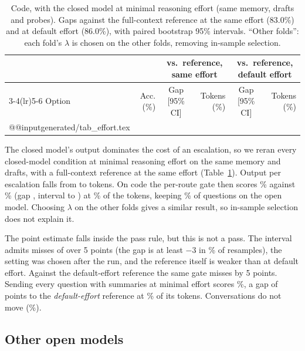 \documentclass[10pt,twocolumn]{article}
\makeatletter
\newcommand{\rows}[1]{\csname @@input\endcsname generated/#1 }
\makeatother
\begin{document}
\begin{table}[t]
\centering
\small
\caption{Code, with the closed model at minimal reasoning effort (same memory, drafts and probes). Gaps against the full-context reference at the same effort (83.0\%) and at default effort (86.0\%), with paired bootstrap 95\% intervals. ``Other folds'': each fold's $\lambda$ is chosen on the other folds, removing in-sample selection.}
\label{tab:effort}
\begin{tabular}{lrcrcr}
\toprule
& & \multicolumn{2}{c}{vs.\ reference, same effort} & \multicolumn{2}{c}{vs.\ reference, default effort}\\
\cmidrule(lr){3-4}\cmidrule(lr){5-6}
Option & Acc. (\%) & Gap [95\% CI] & Tokens (\%) & Gap [95\% CI] & Tokens (\%)\\
\midrule
\rows{tab_effort.tex}
\bottomrule
\end{tabular}
\end{table}

The closed model's output dominates the cost of an escalation, so we reran every closed-model condition at minimal reasoning effort on the same memory and drafts, with a full-context reference at the same effort (Table~\ref{tab:effort}). Output per escalation falls from \escOutDefault{} to \escOutMinimal{} tokens. On code the per-route gate then scores \minPerRoute\% against \minDirect\% (gap \minGap, interval \minLo{} to \minHi) at \minShare\% of the tokens, keeping \minKept\% of questions on the open model. Choosing $\lambda$ on the other folds gives a similar result, so in-sample selection does not explain it.

The point estimate falls inside the pass rule, but this is not a pass. The interval admits misses of over 5 points (the gap is at least $-3$ in \minP\% of resamples), the setting was chosen after the run, and the reference itself is weaker than at default effort. Against the default-effort reference the same gate misses by 5 points. Sending every question with summaries at minimal effort scores \minCompact\%, a gap of \minCompactGapDefault{} points to the \emph{default-effort} reference at \minCompactShareDefault\% of its tokens. Conversations do not move (\minLoco\%).

\subsection{Other open models}
\label{sec:bigger}
\end{document}
